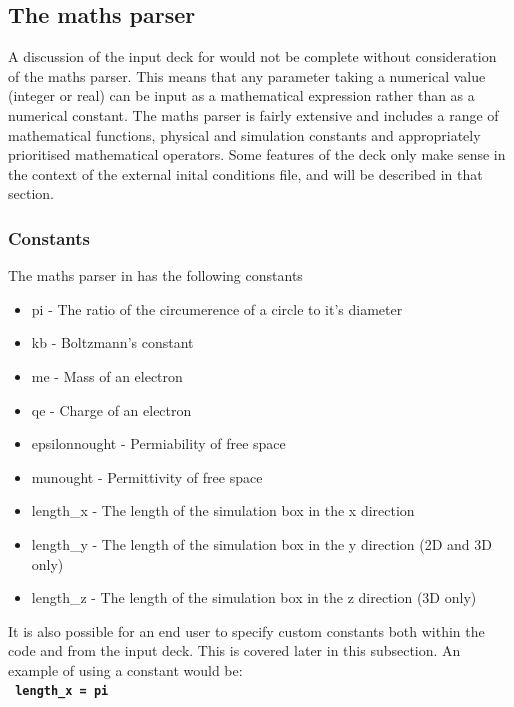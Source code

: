 \documentclass[12pt,a4paper]{article}
\newcommand{\inlinecode}[1]{{\color{warwickred} \bf\texttt{#1}}}
\newcommand{\EPOCH}{{\color{warwickdark}\fontfamily{phv}\selectfont{EPOCH}}}
\begin{document}
\subsection{The maths parser}
A discussion of the input deck for {\EPOCH} would not be complete without
consideration of the maths parser. This means that any parameter taking a
numerical value (integer or real) can be input as a mathematical expression
rather than as a numerical constant. The maths parser is fairly extensive and
includes a range of mathematical functions, physical and simulation constants
and appropriately prioritised mathematical operators. Some features of the
deck only make sense in the context of the external inital conditions file,
and will be described in that section.

\subsubsection{Constants}
The maths parser in {\EPOCH}  has the following constants
\begin{itemize}
\item pi - The ratio of the circumerence of a circle to it's diameter
\item kb - Boltzmann's constant
\item me - Mass of an electron
\item qe - Charge of an electron
\item epsilonnought - Permiability of free space
\item munought - Permittivity of free space
\item length\_x - The length of the simulation box in the x direction
\item length\_y - The length of the simulation box in the y direction (2D and 3D
  only)
\item length\_z - The length of the simulation box in the z direction (3D only)
\end{itemize}

It is also possible for an end user to specify custom constants both within
the code and from the input deck. This is covered later in this subsection. An
example of using a constant would be:\\
\inlinecode{  length\_x = pi}\\
\end{document}
